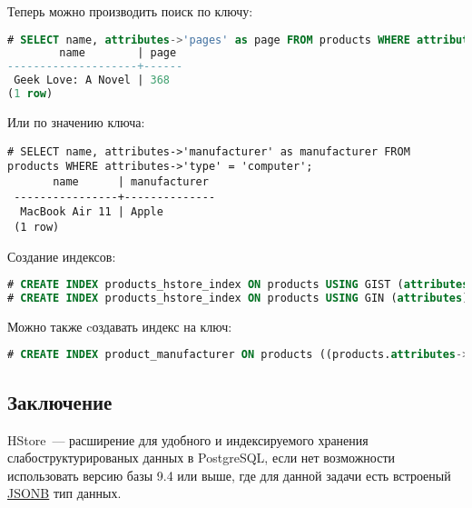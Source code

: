 Теперь можно производить поиск по ключу:

\begin{lstlisting}[language=SQL,label=lst:hstore4,caption=Поиск по ключу]
# SELECT name, attributes->'pages' as page FROM products WHERE attributes ? 'pages';
        name        | page
--------------------+------
 Geek Love: A Novel | 368
(1 row)
\end{lstlisting}

Или по значению ключа:

\begin{lstlisting}[label=lst:hstore5,caption=Поиск по значению ключа]
# SELECT name, attributes->'manufacturer' as manufacturer FROM products WHERE attributes->'type' = 'computer';
       name      | manufacturer
 ----------------+--------------
  MacBook Air 11 | Apple
 (1 row)
\end{lstlisting}

Создание индексов:

\begin{lstlisting}[language=SQL,label=lst:hstore6,caption=Индексы]
# CREATE INDEX products_hstore_index ON products USING GIST (attributes);
# CREATE INDEX products_hstore_index ON products USING GIN (attributes);
\end{lstlisting}

Можно также cоздавать индекс на ключ:

\begin{lstlisting}[language=SQL,label=lst:hstore7,caption=Индекс на ключ]
# CREATE INDEX product_manufacturer ON products ((products.attributes->'manufacturer'));
\end{lstlisting}

\subsection{Заключение}

HStore~--- расширение для удобного и индексируемого хранения слабоструктурированых данных в PostgreSQL, если нет возможности использовать версию базы 9.4 или выше, где для данной задачи есть встроеный \href{https://www.postgresql.org/docs/current/static/datatype-json.html}{JSONB} тип данных.
